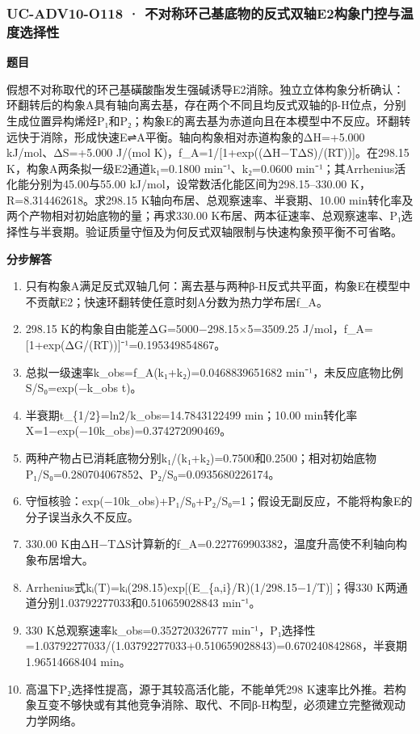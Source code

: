 \documentclass[UTF8,11pt,a4paper]{ctexart}
\begin{document}
\subsubsection*{UC-ADV10-O118 · 不对称环己基底物的反式双轴E2构象门控与温度选择性}
\noindent\textbf{题目}\par
假想不对称取代的环己基磺酸酯发生强碱诱导E2消除。独立立体构象分析确认：环翻转后的构象A具有轴向离去基，存在两个不同且均反式双轴的β-H位点，分别生成位置异构烯烃P₁和P₂；构象E的离去基为赤道向且在本模型中不反应。环翻转远快于消除，形成快速E⇌A平衡。轴向构象相对赤道构象的ΔH=+5.000 kJ/mol、ΔS=+5.000 J/(mol K)，f\_A=1/[1+exp((ΔH−TΔS)/(RT))]。在298.15 K，构象A两条拟一级E2通道k₁=0.1800 min⁻¹、k₂=0.0600 min⁻¹；其Arrhenius活化能分别为45.00与55.00 kJ/mol，设常数活化能区间为298.15–330.00 K，R=8.314462618。求298.15 K轴向布居、总观察速率、半衰期、10.00 min转化率及两个产物相对初始底物的量；再求330.00 K布居、两本征速率、总观察速率、P₁选择性与半衰期。验证质量守恒及为何反式双轴限制与快速构象预平衡不可省略。\par
\medskip\noindent\textbf{分步解答}
\begin{enumerate}
\item 只有构象A满足反式双轴几何：离去基与两种β-H反式共平面，构象E在模型中不贡献E2；快速环翻转使任意时刻A分数为热力学布居f\_A。
\item 298.15 K的构象自由能差ΔG=5000−298.15×5=3509.25 J/mol，f\_A=[1+exp(ΔG/(RT))]⁻¹=0.195349854867。
\item 总拟一级速率k\_obs=f\_A(k₁+k₂)=0.0468839651682 min⁻¹，未反应底物比例S/S₀=exp(−k\_obs t)。
\item 半衰期t\_\{1/2\}=ln2/k\_obs=14.7843122499 min；10.00 min转化率X=1−exp(−10k\_obs)=0.374272090469。
\item 两种产物占已消耗底物分别k₁/(k₁+k₂)=0.7500和0.2500；相对初始底物P₁/S₀=0.280704067852、P₂/S₀=0.0935680226174。
\item 守恒核验：exp(−10k\_obs)+P₁/S₀+P₂/S₀=1；假设无副反应，不能将构象E的分子误当永久不反应。
\item 330.00 K由ΔH−TΔS计算新的f\_A=0.227769903382，温度升高使不利轴向构象布居增大。
\item Arrhenius式kᵢ(T)=kᵢ(298.15)exp[(E\_\{a,i\}/R)(1/298.15−1/T)]；得330 K两通道分别1.03792277033和0.510659028843 min⁻¹。
\item 330 K总观察速率k\_obs=0.352720326777 min⁻¹，P₁选择性=1.03792277033/(1.03792277033+0.510659028843)=0.670240842868，半衰期1.96514668404 min。
\item 高温下P₂选择性提高，源于其较高活化能，不能单凭298 K速率比外推。若构象互变不够快或有其他竞争消除、取代、不同β-H构型，必须建立完整微观动力学网络。
\end{enumerate}
\end{document}
